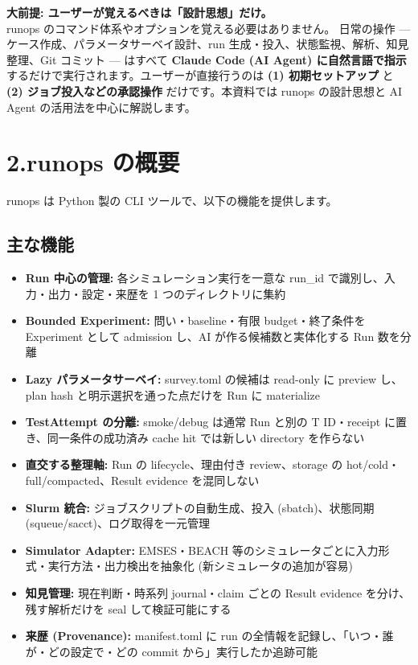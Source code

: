 \documentclass[a4paper,11pt]{article}
\newenvironment{infobox}{%
  \medskip\noindent
  \fboxrule=0.5pt\fboxsep=8pt
  \fcolorbox{infoframe}{infobg}\bgroup\minipage{\dimexpr\linewidth-2\fboxsep-2\fboxrule}
}{%
  \endminipage\egroup\medskip
}
\begin{document}
\begin{infobox}
\textbf{大前提: ユーザーが覚えるべきは「設計思想」だけ。}\\[4pt]
runops のコマンド体系やオプションを覚える必要はありません。
日常の操作 --- ケース作成、パラメータサーベイ設計、run 生成・投入、状態監視、解析、知見整理、Git コミット --- はすべて \textbf{Claude Code (AI Agent) に自然言語で指示} するだけで実行されます。ユーザーが直接行うのは \textbf{(1) 初期セットアップ} と \textbf{(2) ジョブ投入などの承認操作} だけです。本資料では runops の設計思想と AI Agent の活用法を中心に解説します。
\end{infobox}

\section*{\color{darkblue} 2.\quad runops の概要}

runops は Python 製の CLI ツールで、以下の機能を提供します。

\subsection*{\color{accent} 主な機能}

\begin{itemize}[nosep]
  \item \textbf{Run 中心の管理:} 各シミュレーション実行を一意な run\_id で識別し、入力・出力・設定・来歴を 1 つのディレクトリに集約
  \item \textbf{Bounded Experiment:} 問い・baseline・有限 budget・終了条件を Experiment として admission し、AI が作る候補数と実体化する Run 数を分離
  \item \textbf{Lazy パラメータサーベイ:} survey.toml の候補は read-only に preview し、plan hash と明示選択を通った点だけを Run に materialize
  \item \textbf{TestAttempt の分離:} smoke/debug は通常 Run と別の T ID・receipt に置き、同一条件の成功済み cache hit では新しい directory を作らない
  \item \textbf{直交する整理軸:} Run の lifecycle、理由付き review、storage の hot/cold・full/compacted、Result evidence を混同しない
  \item \textbf{Slurm 統合:} ジョブスクリプトの自動生成、投入 (sbatch)、状態同期 (squeue/sacct)、ログ取得を一元管理
  \item \textbf{Simulator Adapter:} EMSES・BEACH 等のシミュレータごとに入力形式・実行方法・出力検出を抽象化 (新シミュレータの追加が容易)
  \item \textbf{知見管理:} 現在判断・時系列 journal・claim ごとの Result evidence を分け、残す解析だけを seal して検証可能にする
  \item \textbf{来歴 (Provenance):} manifest.toml に run の全情報を記録し、「いつ・誰が・どの設定で・どの commit から」実行したか追跡可能
\end{itemize}
\end{document}
